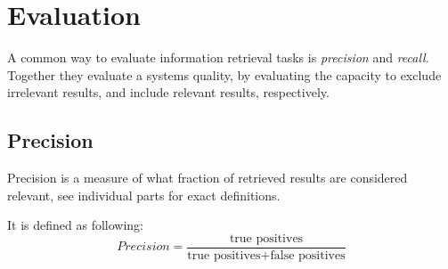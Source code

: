 \documentclass[a4paper,11pt]{kth-mag}
\begin{document}
%


\section{Evaluation}
A common way to evaluate information retrieval tasks is \emph{precision} and \emph{recall}. Together they evaluate a systems quality, by evaluating the capacity to exclude irrelevant results, and include relevant results, respectively.

\subsection{Precision}
Precision is a measure of what fraction of retrieved results are considered relevant, see individual parts for exact definitions.

It is defined as following:
\begin{equation} \label{eq:precision}
Precision = \frac{\text {true positives}}{\text{true positives} + \text{false positives}}
\end{equation}
\end{document}
